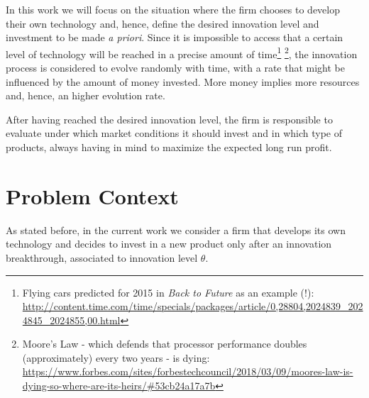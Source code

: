 In this work we will focus on the situation where the firm chooses to develop their own technology and, hence, define the desired innovation level and investment to be made \textit{a priori}. Since it is impossible to access that a certain level of technology will be reached in a precise amount of time\footnote{Flying cars predicted for 2015 in \textit{Back to Future} as an example (!):\\ \url{http://content.time.com/time/specials/packages/article/0,28804,2024839_2024845_2024855,00.html}} \footnote{Moore's Law - which defends that processor performance doubles (approximately) every two years - is dying:\\
\url{https://www.forbes.com/sites/forbestechcouncil/2018/03/09/moores-law-is-dying-so-where-are-its-heirs/\#53cb24a17a7b}}, the innovation process is considered to evolve randomly with time, with a rate that might be influenced by the amount of money invested. More money implies more resources and, hence, an higher evolution rate.

After having reached the desired innovation level, the firm is responsible to evaluate under which market conditions it should invest and in which type of products, always having in mind to maximize the expected long run profit.




\section{Problem Context}
\label{section:context}

As stated before, in the current work we consider a firm that develops its own technology and decides to invest in a new product only after an innovation breakthrough, associated to innovation level $\theta$.

